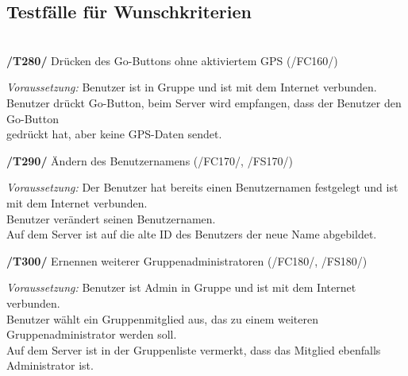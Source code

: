 \subsection{Testfälle für Wunschkriterien}\\

\textbf{/T280/} Drücken des Go-Buttons ohne aktiviertem GPS (/FC160/)\\
\begin{center}
\vspace{-\parskip}
\begin{minipage}[t]{0.9\textwidth}
\emph{Voraussetzung:} Benutzer ist in Gruppe und ist mit dem Internet verbunden.           \\
Benutzer drückt Go-Button, beim Server wird empfangen, dass der Benutzer den Go-Button\\
gedrückt hat, aber keine GPS-Daten sendet.                                             \\
\end{minipage}
\end{center}

\textbf{/T290/} Ändern des Benutzernamens (/FC170/, /FS170/)\\
\begin{center}
\vspace{-\parskip}
\begin{minipage}[t]{0.9\textwidth}
\emph{Voraussetzung:} Der Benutzer hat bereits einen Benutzernamen festgelegt und ist mit dem Internet verbunden.\\
Benutzer verändert seinen Benutzernamen.                                                                   \\
Auf dem Server ist auf die alte ID des Benutzers der neue Name abgebildet.                                  \\
\end{minipage}
\end{center}

\textbf{/T300/} Ernennen weiterer Gruppenadministratoren (/FC180/, /FS180/)\\
\begin{center}
\vspace{-\parskip}
\begin{minipage}[t]{0.9\textwidth}
\emph{Voraussetzung:} Benutzer ist Admin in Gruppe und ist mit dem Internet verbunden.\\
Benutzer wählt ein Gruppenmitglied aus, das zu einem weiteren Gruppenadministrator werden soll.\\
Auf dem Server ist in der Gruppenliste vermerkt, dass das Mitglied ebenfalls Administrator ist.\\
\end{minipage}
\end{center}

